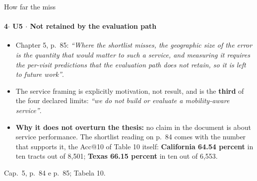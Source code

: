 \documentclass{beamer}
\begin{document}
\begin{frame}[noframenumbering]{How far the miss}
    \framesubtitle{\normalsize 4$\cdot$ \textbf{U5} $\cdot$ Not retained by the evaluation path}
    \hypertarget{u5}{}
    \small
    \begin{itemize}\setlength{\itemsep}{0pt}\setlength{\parskip}{0pt}
        \item Chapter 5, p.~85: \textit{``Where the shortlist misses, the geographic size of the error is the quantity that would matter to such a service, and measuring it requires the per-visit predictions that the evaluation path does not retain, so it is left to future work''}.
        \item The service framing is explicitly motivation, not result, and is the \textbf{third} of the four declared limits: \textit{``we do not build or evaluate a mobility-aware service''}.
        \item \textbf{Why it does not overturn the thesis:} no claim in the document is about service performance. The shortlist reading on p.~84 comes with the number that supports it, the Acc@10 of Table 10 itself: \textbf{California 64.54 percent} in ten tracts out of 8,501; \textbf{Texas 66.15 percent} in ten out of 6,553.
    \end{itemize}
    \vfill
    {\scriptsize
    \begin{minipage}[b]{0.775\linewidth}\raggedright\textcolor{black!70}{Cap.~5, p.~84 e p.~85; Tabela 10.}\end{minipage}\hfill
    \begin{minipage}[b]{0.20\linewidth}\raggedleft \hyperlink{b0}{}\end{minipage}}
\end{frame}
\end{document}
